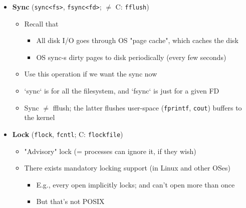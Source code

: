 \documentclass[openany,12pt]{book}
\begin{document}
\begin{itemize}
    \item \textbf{Sync} (\texttt{sync<fs>}, \texttt{fsync<fd>}; $\neq$ C: \texttt{fflush})
    \begin{itemize}
        \item Recall that
        \begin{itemize}
            \item All disk I/O goes through OS "page cache", which caches the disk
            \item OS sync-s dirty pages to disk periodically (every few seconds)
        \end{itemize}
        \item Use this operation if we want the sync now
        \item `sync` is for all the filesystem, and `fsync` is just for a given FD
        \item Sync $\neq$ fflush; the latter flushes user-space (\texttt{fprintf}, \texttt{cout}) buffers to the kernel
    \end{itemize}

    \item \textbf{Lock} (\texttt{flock}, \texttt{fcntl}; C: \texttt{flockfile})
    \begin{itemize}
        \item "Advisory" lock (= processes can ignore it, if they wish)
        \item There exists mandatory locking support (in Linux and other OSes)
        \begin{itemize}
            \item E.g., every open implicitly locks; and can't open more than once
        \item But that's not POSIX
        \end{itemize}
    \end{itemize}
\end{itemize}
\end{document}
